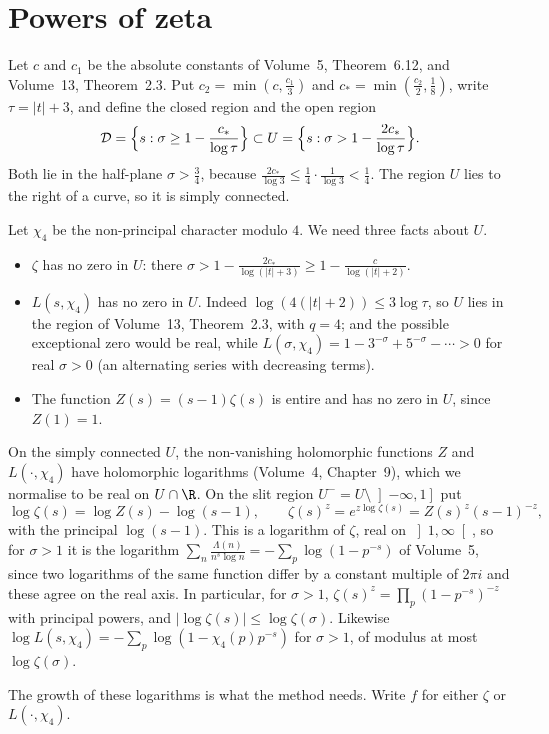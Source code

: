 \section{Powers of zeta}

Let $c$ and $c_1$ be the absolute constants of Volume~5, Theorem~6.12, and Volume~13, Theorem~2.3. Put $c_2=\min(c,\frac{c_1}3)$ and $c_*=\min(\frac{c_2}2,\frac18)$, write $\tau=|t|+3$, and define the closed region and the open region
\[
\mathcal D=\Bigl\{s:\sigma\ge1-\frac{c_*}{\log\tau}\Bigr\}\subset U=\Bigl\{s:\sigma>1-\frac{2c_*}{\log\tau}\Bigr\}.
\]
Both lie in the half-plane $\sigma>\frac34$, because $\frac{2c_*}{\log3}\le\frac14\cdot\frac1{\log 3}<\frac14$. The region $U$ lies to the right of a curve, so it is simply connected.

Let $\chi_4$ be the non-principal character modulo $4$. We need three facts about $U$.
\begin{itemize}
\item $\zeta$ has no zero in $U$: there $\sigma>1-\frac{2c_*}{\log(|t|+3)}\ge1-\frac c{\log(|t|+2)}$.
\item $L(s,\chi_4)$ has no zero in $U$. Indeed $\log(4(|t|+2))\le3\log\tau$, so $U$ lies in the region of Volume~13, Theorem~2.3, with $q=4$; and the possible exceptional zero would be real, while $L(\sigma,\chi_4)=1-3^{-\sigma}+5^{-\sigma}-\cdots>0$ for real $\sigma>0$ (an alternating series with decreasing terms).
\item The function $Z(s)=(s-1)\zeta(s)$ is entire and has no zero in $U$, since $Z(1)=1$.
\end{itemize}
On the simply connected $U$, the non-vanishing holomorphic functions $Z$ and $L(\cdot,\chi_4)$ have holomorphic logarithms (Volume~4, Chapter~9), which we normalise to be real on $U\cap\R$. On the slit region $U^-=U\setminus\left]-\infty,1\right]$ put
\[
\log\zeta(s)=\log Z(s)-\log(s-1),\qquad \zeta(s)^z=e^{z\log\zeta(s)}=Z(s)^z(s-1)^{-z},
\]
with the principal $\log(s-1)$. This is a logarithm of $\zeta$, real on $\left]1,\infty\right[$, so for $\sigma>1$ it is the logarithm $\sum_n\frac{\Lambda(n)}{n^s\log n}=-\sum_p\log(1-p^{-s})$ of Volume~5, since two logarithms of the same function differ by a constant multiple of $2\pi i$ and these agree on the real axis. In particular, for $\sigma>1$, $\zeta(s)^z=\prod_p(1-p^{-s})^{-z}$ with principal powers, and $|\log\zeta(s)|\le\log\zeta(\sigma)$. Likewise $\log L(s,\chi_4)=-\sum_p\log(1-\chi_4(p)p^{-s})$ for $\sigma>1$, of modulus at most $\log\zeta(\sigma)$.

The growth of these logarithms is what the method needs. Write $f$ for either $\zeta$ or $L(\cdot,\chi_4)$.

